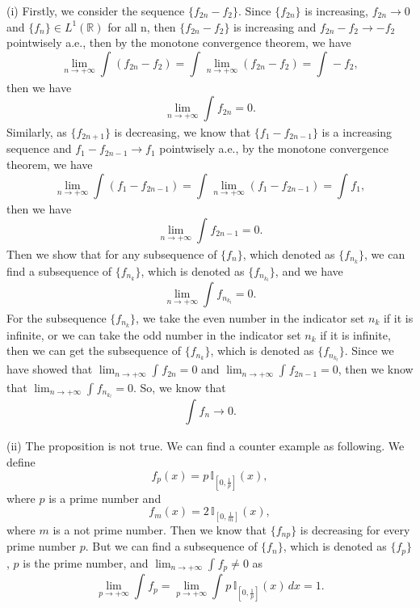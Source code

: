 \documentclass[12pt,a4paper]{ctexart}
\begin{document}
(i) Firstly, we consider the sequence $\{f_{2n} - f_{2}\}$. Since $\{f_{2n}\}$ is increasing, $f_{2n} \to 0$ and $\{f_{n}\} \in L^{1}(\mathbb{R})$ for all n, then $\{f_{2n} - f_{2}\}$ is increasing and $f_{2n} - f_{2} \to -f_{2}$ pointwisely a.e., then by the monotone convergence theorem, we have
\begin{equation*}
    \lim_{n \to + \infty} \int_{}^{} (f_{2n} - f_{2}) =  \int_{}^{} \lim_{n \to + \infty} (f_{2n} - f_{2}) = \int_{}^{}  - f_{2},
\end{equation*}
then we have
\begin{equation*}
    \lim_{n \to + \infty} \int_{}^{} f_{2n} =  0.
\end{equation*}
Similarly, as $\{f_{2n + 1} \}$ is decreasing, we know that  $\{f_{1} - f_{2n -1} \}$ is a increasing sequence and $f_{1} - f_{2n-1} \to f_{1}$ pointwisely a.e., by the monotone convergence theorem, we have
\begin{equation*}
    \lim_{n \to + \infty} \int_{}^{} (f_{1} - f_{2n-1}) =  \int_{}^{} \lim_{n \to + \infty} (f_{1} - f_{2n-1}) = \int_{}^{}  f_{1},
\end{equation*}
then we have
\begin{equation*}
    \lim_{n \to + \infty} \int_{}^{} f_{2n-1} =  0.
\end{equation*}
Then we show that for any subsequence of $\{f_{n}\}$, which denoted as $\{f_{n_{k}}\}$, we can find a subsequence of $\{f_{n_{k}}\}$, which is denoted as $\{f_{n_{k_{l}}}\}$, and we have
\begin{equation*}
    \lim_{n \to + \infty} \int_{}^{} f_{n_{k_{l}}} =  0.
\end{equation*}
For the subsequence $\{f_{n_{k}}\}$, we take the even number in the indicator set ${n_{k}}$ if it is infinite, or we can take the odd number in the indicator set ${n_{k}}$ if it is infinite, then we can get the subsequence of $\{f_{n_{k}}\}$, which is denoted as $\{f_{n_{k_{l}}}\}$. Since we have showed that $\lim_{n \to + \infty} \int_{}^{} f_{2n} =  0$ and $\lim_{n \to + \infty} \int_{}^{} f_{2n-1} =  0$, then we know that $\lim_{n \to + \infty} \int_{}^{} f_{n_{k_{l}}} =  0$. So, we know that
\begin{equation*}
    \int_{}^{} f_{n} \to 0.
\end{equation*}

(ii) The proposition is not true. We can find a counter example as following. We define
\begin{equation*}
    f_{p} (x) = p \, \mathbb{I}_{[0, \frac{1}{p}]} (x),
\end{equation*}
where $p$ is a prime number and
\begin{equation*}
    f_{m} (x) = 2 \, \mathbb{I}_{[0, \frac{1}{m}]} (x),
\end{equation*}
where $m$ is a not prime number. Then we know that $\{f_{np}\}$ is decreasing for every prime number $p$. But we can find a subsequence of $\{f_{n}\}$, which is denoted as $\{f_{p}\}$, $p$ is the prime number, and $\lim_{n \to + \infty} \int_{}^{} f_{p} \neq 0$ as
\begin{equation*}
    \lim_{p \to + \infty} \int_{}^{} f_{p} = \lim_{p \to + \infty} \int_{}^{} p \, \mathbb{I}_{[0, \frac{1}{p}]} (x) \, d x = 1.
\end{equation*}
\end{document}

